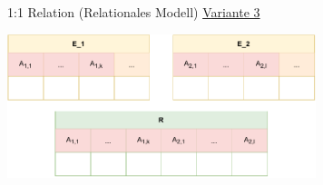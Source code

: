 \begin{defi}{1:1 Relation (Relationales Modell)}
    \underline{Variante 3}
    \begin{center}
        \includegraphics[width=0.675\textwidth]{includes/figures/definition_relational_modell_relation_one_to_one_3.pdf}
    \end{center}
\end{defi}